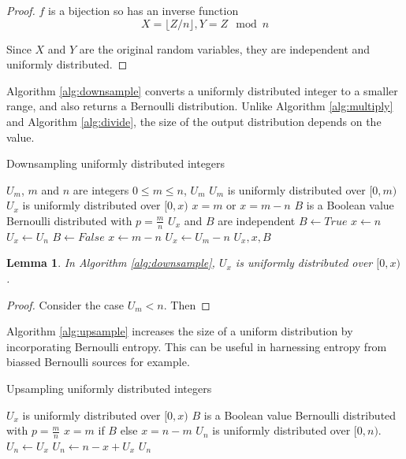 \documentclass[12pt]{article}
\newtheorem{lemma}{Lemma}
\begin{document}
\begin{proof} $f$ is a bijection so has an inverse function 
\begin{equation}    
X = \lfloor Z/n \rfloor, Y = Z \mod n
\end{equation}

Since $X$ and $Y$ are the original random variables, they are independent and uniformly distributed.
\end{proof}

Algorithm \ref{alg:downsample} converts a uniformly distributed integer to a smaller range, and also returns a Bernoulli distribution. Unlike Algorithm \ref{alg:multiply} and Algorithm \ref{alg:divide}, the size of the output distribution depends on the value. 

\begin{algorithm}
\caption{Downsampling uniformly distributed integers}
\label{alg:downsample}
\begin{algorithmic}[1]
    \Require $U_{m}$, $m$ and $n$ are integers 
    \Require $0 \le m \le n$, $U_{m}$
    \Require $U_{m}$ is uniformly distributed over $[0,m)$
\Ensure $U_{x}$ is uniformly distributed over $[0,x)$
\Ensure $x = m$ or $x=m-n$
\Ensure $B$ is a Boolean value Bernoulli distributed with $p=\frac{m}{n}$
\Ensure $U_x$ and $B$ are independent
    \State $B \gets True$  
    \State $x \gets n$
    \State $U_x \gets U_n$
  \Else
    \State $B \gets False$  
    \State $x \gets m-n$
    \State $U_x \gets U_m-n$
  \EndIf
  \State \Return $U_x, x, B$
\EndProcedure
\end{algorithmic}
\end{algorithm}

\begin{lemma}
In Algorithm \ref{alg:downsample}, $U_x$ is uniformly distributed over $[0,x)$.
\end{lemma}

\begin{proof}
Consider the case $U_m < n$. Then 
    
\end{proof}

Algorithm \ref{alg:upsample} increases the size of a uniform distribution by incorporating Bernoulli entropy. This can be useful in harnessing entropy from biassed Bernoulli sources for example.

\begin{algorithm}
\caption{Upsampling uniformly distributed integers}
\label{alg:upsample}
\begin{algorithmic}[1]
\Require $U_x$ is uniformly distributed over $[0,x)$
\Require $B$ is a Boolean value Bernoulli distributed with $p=\frac{m}{n}$
\Require $x=m$ if $B$ else $x=n-m$
\Ensure $U_n$ is uniformly distributed over $[0,n)$.
    \State $U_n \gets U_x$  
  \Else
    \State $U_n \gets n-x+U_x$  
  \EndIf
  \State \Return $U_n$
\EndProcedure
\end{algorithmic}
\end{algorithm}
\end{document}
